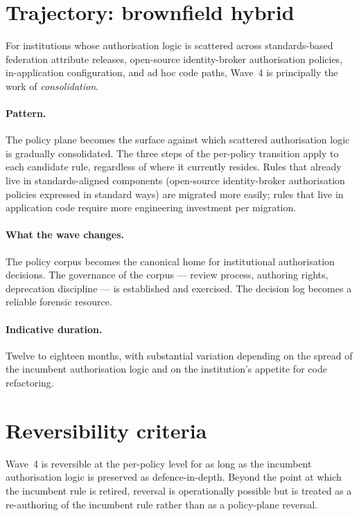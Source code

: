 \section{Trajectory: brownfield hybrid}
\label{sec:w4-brownfield-hybrid}

For institutions whose authorisation logic is scattered across
standards-based federation attribute releases, open-source
identity-broker authorisation policies, in-application
configuration, and ad hoc code paths, Wave~4 is
principally the work of \emph{consolidation}.

\paragraph{Pattern.} The policy plane becomes the surface against
which scattered authorisation logic is gradually consolidated. The
three steps of the per-policy transition apply to each candidate
rule, regardless of where it currently resides. Rules that already
live in standards-aligned components (open-source identity-broker
authorisation policies expressed in standard ways) are migrated
more easily; rules that live in application code require more
engineering investment per migration.

\paragraph{What the wave changes.} The policy corpus becomes the
canonical home for institutional authorisation decisions. The
governance of the corpus --- review process, authoring rights,
deprecation discipline --- is established and exercised. The
decision log becomes a reliable forensic resource.

\paragraph{Indicative duration.} Twelve to eighteen months, with
substantial variation depending on the spread of the incumbent
authorisation logic and on the institution's appetite for code
refactoring.

\section{Reversibility criteria}
\label{sec:w4-reversibility}

Wave~4 is reversible at the per-policy level for as long as the
incumbent authorisation logic is preserved as defence-in-depth.
Beyond the point at which the incumbent rule is retired, reversal
is operationally possible but is treated as a re-authoring of the
incumbent rule rather than as a policy-plane reversal.

